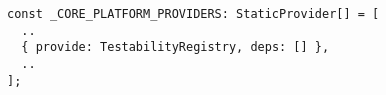 \begin{verbatim}
const _CORE_PLATFORM_PROVIDERS: StaticProvider[] = [
  ..
  { provide: TestabilityRegistry, deps: [] },
  ..
];
\end{verbatim}
